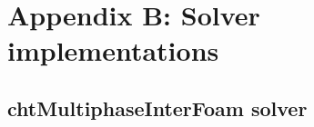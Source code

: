 
\chapter{Appendix B: Solver implementations} %

\label{AppendixB} 

\section{chtMultiphaseInterFoam solver}